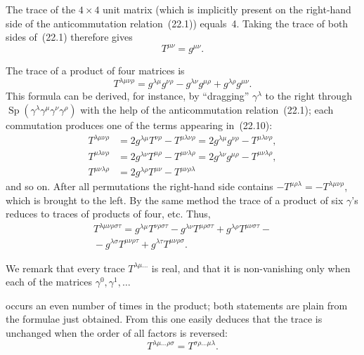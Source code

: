The trace of the $4\times 4$ unit matrix (which is implicitly present on the right-hand side of the anticommutation relation~(22.1)) equals~4. Taking the trace of both sides of~(22.1) therefore gives
\begin{equation}
T^{\mu\nu} = g^{\mu\nu}.
\tag{22.9}
\end{equation}

The trace of a product of four matrices is
\begin{equation}
T^{\lambda\mu\nu\rho} = g^{\lambda\mu}g^{\nu\rho} - g^{\lambda\nu}g^{\mu\rho} + g^{\lambda\rho}g^{\mu\nu}.
\tag{22.10}
\end{equation}
This formula can be derived, for instance, by ``dragging'' $\gamma^\lambda$ to the right through $\operatorname{Sp}(\gamma^\lambda\gamma^\mu\gamma^\nu\gamma^\rho)$ with the help of the anticommutation relation~(22.1); each commutation produces one of the terms appearing in~(22.10):
\begin{equation}
\begin{aligned}
T^{\lambda\mu\nu\rho} &= 2g^{\lambda\mu}T^{\nu\rho} - T^{\mu\lambda\nu\rho} = 2g^{\lambda\mu}g^{\nu\rho} - T^{\mu\lambda\nu\rho},\\
T^{\mu\lambda\nu\rho} &= 2g^{\lambda\nu}T^{\mu\rho} - T^{\mu\nu\lambda\rho} = 2g^{\lambda\nu}g^{\mu\rho} - T^{\mu\nu\lambda\rho},\\
T^{\mu\nu\lambda\rho} &= 2g^{\lambda\rho}T^{\mu\nu} - T^{\mu\nu\rho\lambda}
\end{aligned}
\tag{22.11}
\end{equation}
and so on. After all permutations the right-hand side contains $-T^{\mu\rho\lambda} = -T^{\lambda\mu\nu\rho}$, which is brought to the left. By the same method the trace of a product of six $\gamma$'s reduces to traces of products of four, etc. Thus,
\begin{multline}
T^{\lambda\mu\nu\rho\sigma\tau} = g^{\lambda\mu}T^{\nu\rho\sigma\tau} - g^{\lambda\nu}T^{\mu\rho\sigma\tau} + g^{\lambda\rho}T^{\mu\nu\sigma\tau} -{}\\
{}- g^{\lambda\sigma}T^{\mu\nu\rho\tau} + g^{\lambda\tau}T^{\mu\nu\rho\sigma}.
\tag{22.11}
\end{multline}

We remark that every trace $T^{\lambda\mu\ldots}$ is real, and that it is non-vanishing only when each of the matrices $\gamma^0, \gamma^1, \ldots$

occurs an even number of times in the product; both statements are plain from the formulae just obtained. From this one easily deduces that the trace is unchanged when the order of all factors is reversed:
\begin{equation}
T^{\lambda\mu\ldots\rho\sigma} = T^{\sigma\rho\ldots\mu\lambda}.
\tag{22.12}
\end{equation}

